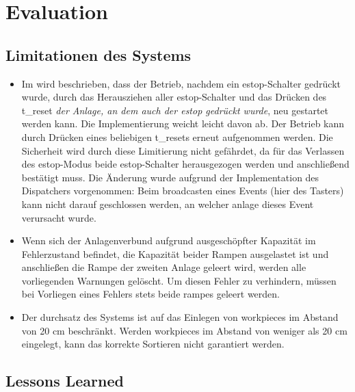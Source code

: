 \chapter{Evaluation}\label{ch:evaluation}



\section{Limitationen des Systems}\label{sec:limitations}

\begin{itemize}
    \item Im  wird beschrieben, dass der Betrieb, nachdem ein \gls{estop}-Schalter gedrückt wurde,
    durch das Herausziehen aller \gls{estop}-Schalter und das Drücken des \gls{t_reset}
    \textit{der Anlage, an dem auch der \gls{estop} gedrückt wurde}, neu gestartet werden kann.
    Die Implementierung weicht leicht davon ab.
    Der Betrieb kann durch Drücken eines beliebigen \glspl{t_reset} erneut aufgenommen werden.
    Die Sicherheit wird durch diese Limitierung nicht gefährdet, da für das Verlassen des
    \gls{estop}-Modus beide \gls{estop}-Schalter herausgezogen werden und anschließend bestätigt muss.
    Die Änderung wurde aufgrund der Implementation des Dispatchers vorgenommen:
    Beim broadcasten eines Events (hier des Tasters) kann nicht darauf geschlossen werden, an
    welcher \gls{anlage} dieses Event verursacht wurde.
    \item Wenn sich der Anlagenverbund aufgrund ausgeschöpfter Kapazität im Fehlerzustand befindet,
    die Kapazität beider Rampen ausgelastet ist und anschließen die Rampe der zweiten Anlage
    geleert wird, werden alle vorliegenden Warnungen gelöscht.
    Um diesen Fehler zu verhindern, müssen bei Vorliegen eines Fehlers stets beide \glspl{rampe}
    geleert werden.
    \item Der \gls{durchsatz} des Systems ist auf das Einlegen von \glspl{workpiece} im
    Abstand von 20 cm beschränkt.
    Werden \glspl{workpiece} im Abstand von weniger als 20 cm eingelegt, kann das korrekte Sortieren
    nicht garantiert werden.
\end{itemize}


\section{Lessons Learned}\label{sec:lessons-learned}